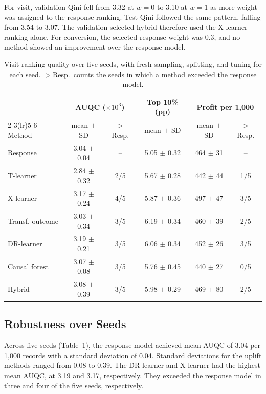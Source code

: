 \documentclass[conference]{IEEEtran}
\begin{document}
For visit, validation Qini fell from 3.32 at \(w=0\) to 3.10 at
\(w=1\) as more weight was assigned to the response ranking.
Test Qini followed the same pattern, falling from 3.54 to 3.07.
The validation-selected hybrid therefore used the X-learner ranking
alone. For conversion, the selected response weight was 0.3, and no
method showed an improvement over the response model.

\begin{table}[t]
  \centering
  \caption{Visit ranking quality over five seeds, with fresh sampling,
           splitting, and tuning for each seed. \(>\)Resp.\ counts the
           seeds in which a method exceeded the response model.}
  \label{tab:seeds}
  \setlength{\tabcolsep}{2.5pt}
  \scriptsize
  \begin{tabular}{lccccc}
\toprule
 & \multicolumn{2}{c}{AUQC ($\times10^3$)} & Top 10\% (pp) & \multicolumn{2}{c}{Profit per 1,000} \\
\cmidrule(lr){2-3}\cmidrule(lr){5-6}
Method & mean $\pm$ SD & $>$Resp. & mean $\pm$ SD & mean $\pm$ SD & $>$Resp. \\
\midrule
Response & 3.04 $\pm$ 0.04 & -- & 5.05 $\pm$ 0.32 & 464 $\pm$ 31 & -- \\
T-learner & 2.84 $\pm$ 0.32 & 2/5 & 5.67 $\pm$ 0.28 & 442 $\pm$ 44 & 1/5 \\
X-learner & 3.17 $\pm$ 0.24 & 4/5 & 5.87 $\pm$ 0.36 & 497 $\pm$ 47 & 3/5 \\
Transf. outcome & 3.03 $\pm$ 0.34 & 3/5 & 6.19 $\pm$ 0.34 & 460 $\pm$ 39 & 2/5 \\
DR-learner & 3.19 $\pm$ 0.21 & 3/5 & 6.06 $\pm$ 0.34 & 452 $\pm$ 26 & 3/5 \\
Causal forest & 3.07 $\pm$ 0.08 & 3/5 & 5.76 $\pm$ 0.45 & 440 $\pm$ 27 & 0/5 \\
Hybrid & 3.08 $\pm$ 0.39 & 3/5 & 5.98 $\pm$ 0.29 & 469 $\pm$ 80 & 2/5 \\
\bottomrule
\end{tabular}
\end{table}

\subsection{Robustness over Seeds}

Across five seeds (Table~\ref{tab:seeds}), the response model achieved
mean AUQC of 3.04 per 1,000 records with a standard deviation of 0.04.
Standard deviations for the uplift methods ranged from 0.08 to 0.39.
The DR-learner and X-learner had the highest mean AUQC, at 3.19 and
3.17, respectively. They exceeded the response model in three and four
of the five seeds, respectively.
\end{document}
